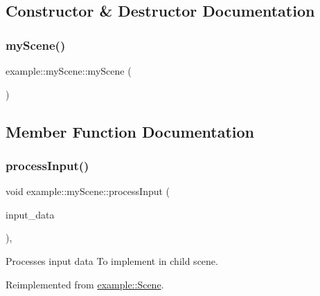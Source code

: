 \subsection{Constructor \& Destructor Documentation}
\mbox{\label{classexample_1_1my_scene_abfdb48523181cb57fbc8106c835890b9}} 
\subsubsection{\texorpdfstring{my\+Scene()}{myScene()}}
{\footnotesize\ttfamily example\+::my\+Scene\+::my\+Scene (\begin{DoxyParamCaption}{ }\end{DoxyParamCaption})}



\subsection{Member Function Documentation}
\mbox{\label{classexample_1_1my_scene_a61a6d862d5c0b1ef8e31daa089699bd4}} 
\subsubsection{\texorpdfstring{process\+Input()}{processInput()}}
{\footnotesize\ttfamily void example\+::my\+Scene\+::process\+Input (\begin{DoxyParamCaption}\item[{\mbox{\hyperlink{classexample_1_1_input_af6bf4fd763ca01bd106ca3b03f162e3d}{Input\+::\+Input\+Data}}}]{input\+\_\+data }\end{DoxyParamCaption})\hspace{0.3cm}{\ttfamily [override]}, {\ttfamily [virtual]}}



Processes input data To implement in child scene. 



Reimplemented from \mbox{\hyperlink{classexample_1_1_scene_a798a6c155c57e9368b72014795a64d77}{example\+::\+Scene}}.

\mbox{\label{classexample_1_1my_scene_a56843ecc84a14a7938897baa09b29e3f}} 
